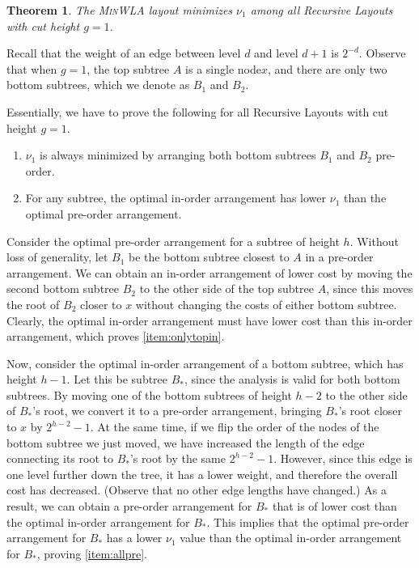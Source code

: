 \documentclass[10pt,conference,letterpaper]{IEEEtran}
\newtheorem{theorem*}{Theorem}
\newcommand{\note}[1]{}
\newcommand{\comment}[1]{}
\newcommand{\node}{node\xspace}
\newcommand{\nodes}{nodes\xspace}
\newcommand{\RLs}{Recursive Layouts\xspace}
\newcommand{\pmean}[1][p]{\ensuremath{\mu_{#1}}\xspace}
\newcommand{\pwmean}[1][p]{\ensuremath{\nu_{#1}}\xspace}
\newcommand{\minwla}{\textsc{MinWLA}\xspace}
\begin{document}
\begin{theorem*}The \minwla layout minimizes \pwmean[1] among all \RLs with cut height $g=1$.
\end{theorem*}
\begin{IEEEproof}
\comment{
We introduce the following notation ot prove that, for binary tree $T$, the \minwla layout minimizes \pmean[1] among all \RLs with cut height $g=1$. 
For trees of height $h$ cut at height $g=1$, let $C_I^{h}$, $C_P^{h}$ be $W$ times average weighted edge length \pwmean[1] when the top subtree is arranged in-order and pre-order, respectively.
}
Recall that the weight of an edge between level $d$ and level $d+1$ is $2^{-d}$.
Observe that when $g=1$, the top subtree $A$ is a single \node $x$, and there are only two bottom subtrees, which we denote as $B_1$ and $B_2$. 
\note{We use subscripts $I$ and $P$ elsewhere. Changed here.}
\comment{
We make no assumptions on the arrangement of the bottom subtrees -- this is what \autoref{thm:order} proves. 
}
Essentially, we have to prove the following for all \RLs with cut height $g=1$. 
\begin{enumerate}
\item
\label{item:allpre}
\pwmean[1] is always minimized by arranging both bottom subtrees $B_{1}$ and $B_{2}$ pre-order.
\item
\label{item:onlytopin}
For any subtree, the optimal in-order arrangement has lower \pwmean[1] than the optimal pre-order arrangement. 
\end{enumerate}
Consider the optimal pre-order arrangement for a subtree of height $h$. Without loss of generality, let $B_1$ be the bottom subtree closest to $A$ in a pre-order arrangement.
We can obtain an in-order arrangement of lower cost by moving the second bottom subtree $B_2$ to the other side of the top subtree $A$, since this moves the root of $B_2$ closer to $x$ without changing the costs of either bottom subtree. Clearly, the optimal in-order arrangement must have lower cost than this in-order arrangement, which proves \autoref{item:onlytopin}. 

Now, consider the optimal in-order arrangement of a bottom subtree, which has height $h-1$. Let this be subtree $B_*$, since the analysis is valid for both bottom subtrees.
By moving one of the bottom subtrees of height $h-2$ to the other side of $B_*$'s root, we convert it to a pre-order arrangement, bringing $B_*$'s root closer to $x$ by $2^{h-2} - 1$. At the same time, if we flip
the order of the \nodes of the bottom subtree we just moved, we 
have increased the length of the edge connecting its root to $B_*$'s root by the same $2^{h-2}-1$. However, since this edge is one level further down the tree, it has a lower weight, and therefore the overall cost has decreased. (Observe that no other edge lengths have changed.) As a result, we can obtain a pre-order arrangement for $B_*$ that is of lower cost than the optimal in-order arrangement for $B_*$. This implies that the optimal pre-order arrangement for $B_*$ has a lower \pwmean[1] value than the optimal in-order arrangement for $B_*$, proving \autoref{item:allpre}.


\end{IEEEproof}
\end{document}
